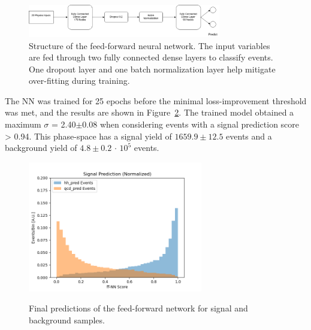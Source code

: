 \begin{figure}[!h] 
\begin{center}
\includegraphics*[width=0.75\textwidth] {ffNN/figures/flowchart_ffNN.png}
\caption{Structure of the feed-forward neural network. The input variables are fed through two fully connected dense layers to classify events. One dropout layer and one batch normalization layer help mitigate over-fitting during training.}
  \label{fig:nn}
\end{center}
\end{figure}

The NN was trained for 25 epochs before the minimal loss-improvement threshold was met, and the results are shown in Figure~\ref{fig:results_nn}. The trained model obtained a maximum $\sigma$ = 2.40$\pm$0.08 when considering events with a signal prediction score > 0.94. This phase-space has a signal yield of $1659.9 \pm 12.5$ events and a background yield of $4.8 \pm 0.2$ $\cdot$ $10^5$ events. %

\begin{figure}[!h] 
\begin{center}
   \includegraphics[width = 3in]{ffNN/figures/score_ffnn_v3}\\
\caption{Final predictions of the feed-forward network for signal and background samples.}
  \label{fig:results_nn}
\end{center}
\end{figure}

